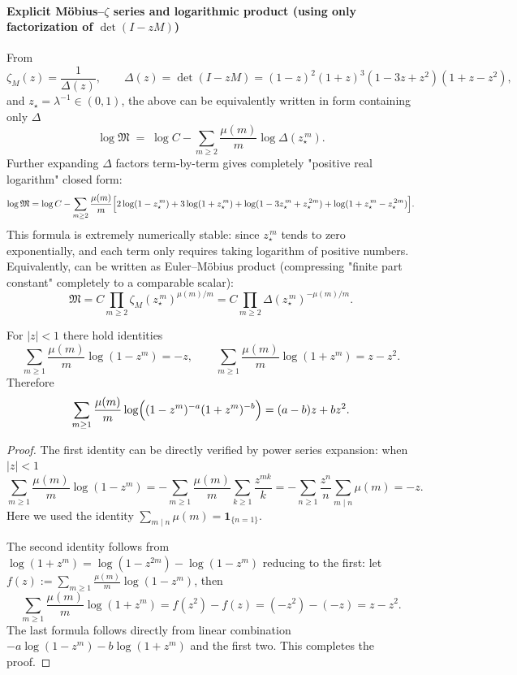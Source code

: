 \paragraph{Explicit Möbius--$\zeta$ series and logarithmic product (using only factorization of \texorpdfstring{$\det(I-zM)$}{det})}
From
\[
\zeta_M(z)=\frac{1}{\Delta(z)},\qquad
\Delta(z)=\det(I-zM)=(1-z)^2(1+z)^3(1-3z+z^2)(1+z-z^2),
\]
and $z_\star=\lambda^{-1}\in(0,1)$, the above can be equivalently written in form containing only $\Delta$
\[
\log\mathfrak{M}
\;=\;
\log C-\sum_{m\ge 2}\frac{\mu(m)}{m}\log \Delta(z_\star^{\,m}).
\]
Further expanding $\Delta$ factors term-by-term gives completely "positive real logarithm" closed form:
\[
\log\mathfrak{M}
=\log C
-\sum_{m\ge 2}\frac{\mu(m)}{m}\Bigl[
2\log(1-z_\star^{\,m})+3\log(1+z_\star^{\,m})+\log(1-3z_\star^{\,m}+z_\star^{\,2m})+\log(1+z_\star^{\,m}-z_\star^{\,2m})
\Bigr].
\]
This formula is extremely numerically stable: since $z_\star^{\,m}$ tends to zero exponentially, and each term only requires taking logarithm of positive numbers.
Equivalently, can be written as Euler--Möbius product (compressing "finite part constant" completely to a comparable scalar):
\[
\mathfrak{M}
=C\prod_{m\ge 2}\zeta_M(z_\star^{\,m})^{\mu(m)/m}
=C\prod_{m\ge 2}\Delta(z_\star^{\,m})^{-\mu(m)/m}.
\]
\begin{lemma}\label{lem:mobius-collapse}
For $|z|<1$ there hold identities
\[
\sum_{m\ge 1}\frac{\mu(m)}{m}\log(1-z^m)=-z,\qquad
\sum_{m\ge 1}\frac{\mu(m)}{m}\log(1+z^m)=z-z^2.
\]
Therefore
\[
\sum_{m\ge 1}\frac{\mu(m)}{m}\log\Bigl((1-z^m)^{-a}(1+z^m)^{-b}\Bigr)=(a-b)z+bz^2.
\]
\end{lemma}

\begin{proof}
The first identity can be directly verified by power series expansion: when $|z|<1$
\[
\sum_{m\ge 1}\frac{\mu(m)}{m}\log(1-z^m)
=-\sum_{m\ge 1}\frac{\mu(m)}{m}\sum_{k\ge 1}\frac{z^{mk}}{k}
=-\sum_{n\ge 1}\frac{z^n}{n}\sum_{m\mid n}\mu(m)
=-z.
\]
Here we used the identity $\sum_{m\mid n}\mu(m)=\mathbf{1}_{\{n=1\}}$.

The second identity follows from
\(
\log(1+z^m)=\log(1-z^{2m})-\log(1-z^m)
\)
reducing to the first: let
\(
f(z):=\sum_{m\ge 1}\frac{\mu(m)}{m}\log(1-z^m)
\),
then
\[
\sum_{m\ge 1}\frac{\mu(m)}{m}\log(1+z^m)=f(z^2)-f(z)=(-z^2)-(-z)=z-z^2.
\]
The last formula follows directly from linear combination
\(
-a\log(1-z^m)-b\log(1+z^m)
\)
and the first two. This completes the proof.
\end{proof}

